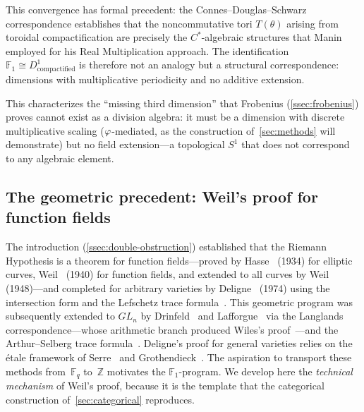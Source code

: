 This convergence has formal precedent: the Connes--Douglas--Schwarz
correspondence establishes that the noncommutative tori
$T(\theta)$ arising from toroidal compactification are precisely the
$C^*$-algebraic structures that Manin employed for his Real
Multiplication approach.  The identification
$\mathbb{F}_1 \cong D^1_{\text{compactified}}$ is therefore not an
analogy but a structural correspondence: dimensions with
multiplicative periodicity and no additive extension.

This characterizes the ``missing third dimension'' that
Frobenius (\cref{ssec:frobenius}) proves cannot exist as a division
algebra: it must be a dimension with discrete multiplicative scaling
($\varphi$-mediated, as the construction of~\cref{sec:methods} will demonstrate) but
no field extension---a topological $S^1$ that does not correspond to
any algebraic element.



\subsection{The geometric precedent: Weil's proof for function
fields}\label{ssec:weil}

The introduction (\cref{ssec:double-obstruction}) established that the Riemann Hypothesis is a theorem for function fields---proved by Hasse~\cite{hasse34} (1934) for elliptic curves, Weil~\cite{weil40} (1940) for function fields, and extended to all curves by Weil~\cite{weil48} (1948)---and completed for arbitrary varieties by Deligne~\cite{deligne74} (1974) using the intersection form and the Lefschetz trace formula~\cite{milne15,oort14}. This geometric program was subsequently extended to $GL_n$ by Drinfeld~\cite{drinfeld77} and Lafforgue~\cite{lafforgue02} via the Langlands correspondence---whose arithmetic branch produced Wiles's proof~\cite{wiles95}---and the Arthur--Selberg trace formula~\cite{arthur89}. Deligne's proof for general varieties relies on the \'etale framework of Serre~\cite{serre55} and Grothendieck~\cite{grothendieck1960elements}. The aspiration to transport these methods from~$\mathbb{F}_q$ to~$\mathbb{Z}$ motivates the $\mathbb{F}_1$-program.  We develop here the \emph{technical
mechanism} of Weil's proof, because it is the template that the
categorical construction of~\cref{sec:categorical} reproduces.

